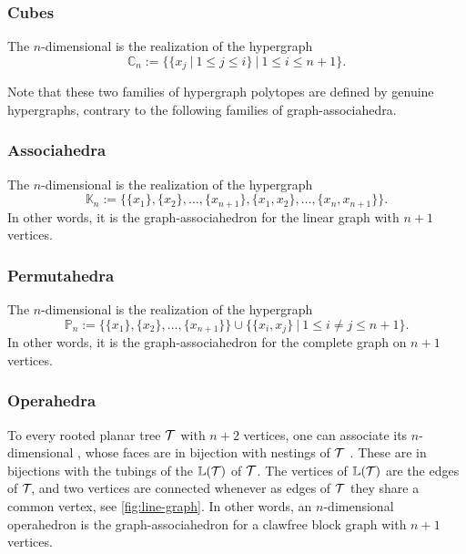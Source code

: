 \subsubsection{Cubes}
The $n$-dimensional  is the realization of the hypergraph
$$\mathbb{C}_n:=\{\{x_j \ | \ 1 \leq j \leq i \} \ | \ 1 \leq i \leq n+1\}.$$

\begin{rem}
  Note that these two families of hypergraph polytopes are defined by genuine hypergraphs, contrary to the following families of graph-associahedra.
\end{rem}

\subsubsection{Associahedra}
The $n$-dimensional  is the realization of the hypergraph 
$$\mathbb{K}_n:=\{\{x_1\},\{x_2\},\ldots,\{x_{n+1}\},\{x_1,x_2\},\ldots,\{x_n,x_{n+1}\}\}.$$
In other words, it is the graph-associahedron for the linear graph with $n+1$ vertices.

\subsubsection{Permutahedra}
The $n$-dimensional  is the realization of the hypergraph 
$$\mathbb{P}_n:=\{\{x_1\},\{x_2\},\ldots,\{x_{n+1}\}\} \cup \{\{x_i,x_j\} \ | \ 1 \leq i \neq j \leq n+1 \}.$$
In other words, it is the graph-associahedron for the complete graph on $n+1$ vertices.

\subsubsection{Operahedra}
To every rooted planar tree $\mathcal{T}$ with $n+2$ vertices, one can associate its $n$-dimensional , whose faces are in bijection with nestings of $\mathcal{T}$ \cite{laplante-anfossiDiagonalOperahedra2022a,CLA1}.
These are in bijections with the tubings of the  $\mathbb{L}(\mathcal{T})$ of $\mathcal{T}$.
The vertices of $\mathbb{L}(\mathcal{T})$ are the edges of ${\cal T}\!$, and two vertices are connected whenever as edges of ${\cal T}$ they share a common vertex, see \cref{fig:line-graph}.
In other words, an $n$-dimensional operahedron is the graph-associahedron for a clawfree block graph with $n+1$ vertices.

